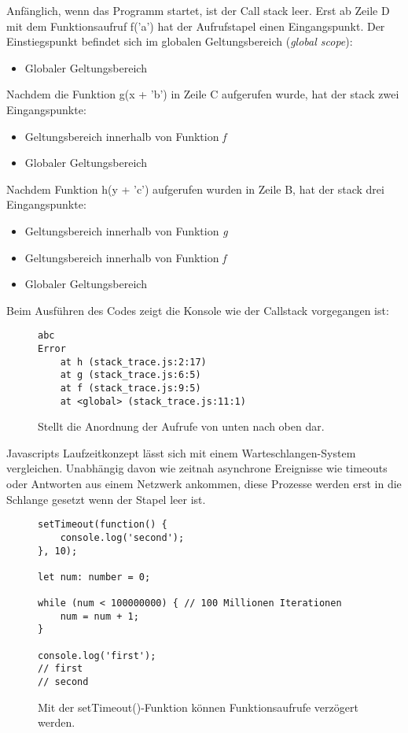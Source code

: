 \noindent
Anfänglich, wenn das Programm startet, ist der Call stack leer. Erst ab Zeile D mit dem Funktionsaufruf f('a') hat der Aufrufstapel einen Eingangspunkt. Der Einstiegspunkt befindet sich im globalen Geltungsbereich (\textit{global scope}):

\begin{itemize}
\item Globaler Geltungsbereich
\end{itemize}

\noindent
Nachdem die Funktion g(x + 'b') in Zeile C aufgerufen wurde, hat der stack zwei Eingangspunkte:

\begin{itemize}
\item Geltungsbereich innerhalb von Funktion \textit{f}
\item Globaler Geltungsbereich
\end{itemize}

\noindent
Nachdem Funktion h(y + 'c') aufgerufen wurden in Zeile B, hat der stack drei Eingangspunkte:

\begin{itemize}
\item Geltungsbereich innerhalb von Funktion \textit{g}
\item Geltungsbereich innerhalb von Funktion \textit{f}
\item Globaler Geltungsbereich
\end{itemize}

\noindent
Beim Ausführen des Codes zeigt die Konsole wie der Callstack vorgegangen ist:

\begin{figure}[H]
\begin{lstlisting}
abc
Error
    at h (stack_trace.js:2:17)
    at g (stack_trace.js:6:5)
    at f (stack_trace.js:9:5)
    at <global> (stack_trace.js:11:1)
\end{lstlisting}
\caption{Stellt die Anordnung der Aufrufe von unten nach oben dar.}
\label{stack-trace-error}
\end{figure}

\noindent
Javascripts Laufzeitkonzept lässt sich mit einem Warteschlangen-System vergleichen. Unabhängig davon wie zeitnah asynchrone Ereignisse wie timeouts oder Antworten aus einem Netzwerk ankommen, diese Prozesse werden erst in die Schlange gesetzt wenn der Stapel leer ist.

\begin{figure}[H]
\begin{lstlisting}[basicstyle=\small]
setTimeout(function() {
    console.log('second');
}, 10);

let num: number = 0;

while (num < 100000000) { // 100 Millionen Iterationen
    num = num + 1;
}

console.log('first');
// first
// second
\end{lstlisting}
\caption{Mit der setTimeout()-Funktion können Funktionsaufrufe verzögert werden.}
\label{First-timeout-example}
\end{figure}

